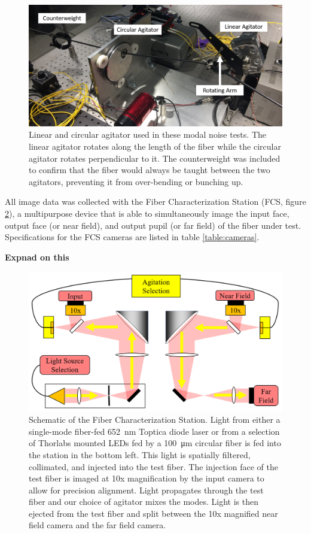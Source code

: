 \documentclass[twocolumn]{emulateapj}
\begin{document}
\begin{figure}
\centering
	\includegraphics[width=\columnwidth]{images/agitators_labelled.png}
	\caption{Linear and circular agitator used in these modal noise tests. The linear agitator rotates along the length of the fiber while the circular agitator rotates perpendicular to it. The counterweight was included to confirm that the fiber would always be taught between the two agitators, preventing it from over-bending or bunching up.}
\label{fig:agitators}
\end{figure} 

All image data was collected with the Fiber Characterization Station (FCS, figure \ref{fig:fcs}), a multipurpose device that is able to simultaneously image the input face, output face (or near field), and output pupil (or far field) of the fiber under test. Specifications for the FCS cameras are listed in table \ref{table:cameras}.

\textbf{Expnad on this}

\begin{figure}
\centering
	\includegraphics[width=\columnwidth]{images/fcs_schematic.png}
	\caption{Schematic of the Fiber Characterization Station. Light from either a single-mode fiber-fed \SI{652}{\nano\meter} Toptica diode laser or from a selection of Thorlabs mounted LEDs fed by a \SI{100}{\micro\meter} circular fiber is fed into the station in the bottom left. This light is spatially filtered, collimated, and injected into the test fiber. The injection face of the test fiber is imaged at 10x magnification by the input camera to allow for precision alignment. Light propagates through the test fiber and our choice of agitator mixes the modes. Light is then ejected from the test fiber and split between the 10x magnified near field camera and the far field camera.}
\label{fig:fcs}
\end{figure}
\end{document}
